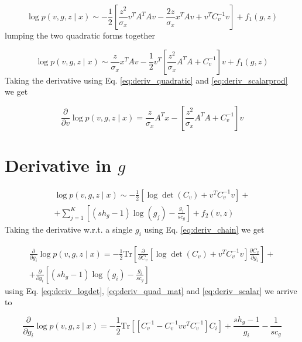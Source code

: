 \documentclass{paper}
\begin{document}
\begin{equation}
\log p(v,g,z \mid x) \sim - \frac{1}{2} \left[ \frac{z^2}{ \sigma_x} v^TA^TAv - \frac{2z}{ \sigma_x}  x^TAv +  v^T C_v^{-1} v \right]  + f_1(g,z)
\end{equation}
%
lumping the two quadratic forms together

\begin{equation}
\log p(v,g,z \mid x) \sim \frac{z}{ \sigma_x}  x^TAv -  \frac{1}{2} v^T \left[ \frac{z^2}{\sigma_x}A^TA + C_v^{-1} \right] v + f_1(g,z)
\end{equation}
%
Taking the derivative using Eq. \ref{eq:deriv_quadratic} and \ref{eq:deriv_scalarprod} we get

\begin{equation}
\frac{\partial}{\partial v} \log p(v,g,z \mid x) =  \frac{z}{ \sigma_x}  A^Tx - \left[ \frac{z^2}{\sigma_x}A^TA + C_v^{-1} \right] v 
\end{equation}


\section{Derivative in $g$}

\begin{equation}
\begin{split}
\log p(v,g,z \mid x) \sim - \frac{1}{2} \left[ \log \det \left( C_v \right) + v^T C_v^{-1} v \right] + \\
+ \sum_{j=1}^K \left[ (sh_g - 1) \log(g_j) - \frac{g_j}{sc_g} \right]   + f_2(v,z)
\end{split}
\end{equation}
%
Taking the derivative w.r.t. a single $g_i$ using Eq. \ref{eq:deriv_chain} we get

\begin{equation}
\begin{split}
\frac{\partial}{\partial g_i} \log p(v,g,z \mid x) =  - \frac{1}{2} \textrm{Tr} \left[ \frac{\partial}{\partial C_v} \left[ \log \det \left( C_v \right) + v^T C_v^{-1} v \right] \frac{\partial C_v}{\partial g_i}\right]  + \\
+ \frac{\partial}{\partial g_i} \left[ (sh_g - 1) \log(g_i) - \frac{g_i}{sc_g} \right]
\end{split}
\end{equation}
%
using Eq. \ref{eq:deriv_logdet}, \ref{eq:deriv_quad_mat} and \ref{eq:deriv_scalar} we arrive to

\begin{equation}
\frac{\partial}{\partial g_i} \log p(v,g,z \mid x) =  - \frac{1}{2} \textrm{Tr} \left[ \left[ C_v^{-1} - C_v^{-1} v v^T C_v^{-1} \right] C_i \right]  + \frac{sh_g - 1}{g_i} - \frac{1}{sc_g}
\end{equation}
\end{document}
